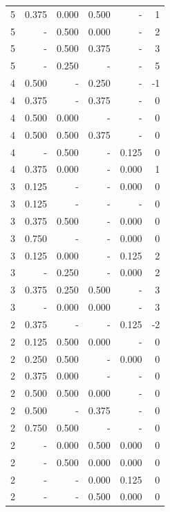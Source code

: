 \documentclass[a4paper]{article}\usepackage{graphicx, color}
\begin{document}
\begin{table}[ht]
\begin{tabular}{rrrrrr}
   \rowcolor{badColor} 5 & 0.375 & 0.000 & 0.500 & - & 1 \\ 
   \rowcolor{badColor} 5 & - & 0.500 & 0.000 & - & 2 \\ 
  5 & - & 0.500 & 0.375 & - & 3 \\ 
  5 & - & 0.250 & - & - & 5 \\ 
   \rowcolor{sosoColor} 4 & 0.500 & - & 0.250 & - & -1 \\ 
   \rowcolor{sosoColor} 4 & 0.375 & - & 0.375 & - & 0 \\ 
  4 & 0.500 & 0.000 & - & - & 0 \\ 
  4 & 0.500 & 0.500 & 0.375 & - & 0 \\ 
  4 & - & 0.500 & - & 0.125 & 0 \\ 
  4 & 0.375 & 0.000 & - & 0.000 & 1 \\ 
   \rowcolor{nullColor} 3 & 0.125 & - & - & 0.000 & 0 \\ 
   \rowcolor{nullColor} 3 & 0.125 & - & - & - & 0 \\ 
  3 & 0.375 & 0.500 & - & 0.000 & 0 \\ 
   \rowcolor{nullColor} 3 & 0.750 & - & - & 0.000 & 0 \\ 
  3 & 0.125 & 0.000 & - & 0.125 & 2 \\ 
  3 & - & 0.250 & - & 0.000 & 2 \\ 
   \rowcolor{badColor} 3 & 0.375 & 0.250 & 0.500 & - & 3 \\ 
   \rowcolor{goodColor} 3 & - & 0.000 & 0.000 & - & 3 \\ 
   \rowcolor{nullColor} 2 & 0.375 & - & - & 0.125 & -2 \\ 
   \rowcolor{badColor} 2 & 0.125 & 0.500 & 0.000 & - & 0 \\ 
  2 & 0.250 & 0.500 & - & 0.000 & 0 \\ 
  2 & 0.375 & 0.000 & - & - & 0 \\ 
   \rowcolor{badColor} 2 & 0.500 & 0.500 & 0.000 & - & 0 \\ 
   \rowcolor{sosoColor} 2 & 0.500 & - & 0.375 & - & 0 \\ 
  2 & 0.750 & 0.500 & - & - & 0 \\ 
   \rowcolor{badColor} 2 & - & 0.000 & 0.500 & 0.000 & 0 \\ 
   \rowcolor{badColor} 2 & - & 0.500 & 0.000 & 0.000 & 0 \\ 
   \rowcolor{sosoColor} 2 & - & - & 0.000 & 0.125 & 0 \\ 
   \rowcolor{sosoColor} 2 & - & - & 0.500 & 0.000 & 0 \\ 

\end{tabular}
\end{table}
\end{document}
